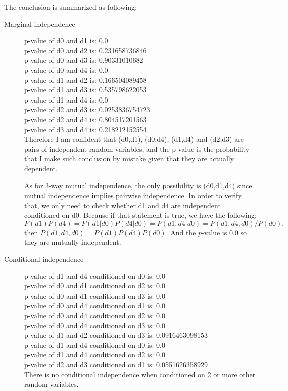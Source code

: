 \documentclass[11pt]{article}
\begin{document}
The conclusion is summarized as following:
\begin{description}
\item[Marginal independence]
p-value of d0 and d1 is: 0.0\\
p-value of d0 and d2 is: 0.231658736846\\
p-value of d0 and d3 is: 0.90331010682\\
p-value of d0 and d4 is: 0.0\\
p-value of d1 and d2 is: 0.166504089458\\
p-value of d1 and d3 is: 0.535798622053\\
p-value of d1 and d4 is: 0.0\\
p-value of d2 and d3 is: 0.0253836754723\\
p-value of d2 and d4 is: 0.804517201563\\
p-value of d3 and d4 is: 0.218212152554\\

Therefore I am confident that (d0,d1), (d0,d4), (d1,d4) and (d2,d3) are pairs of independent random variables, and the p-value is the probability that I make such conclusion by mistake given that they are actually dependent.

As for 3-way mutual independence, the only possibility is (d0,d1,d4) since mutual independence implies pairwise independence. In order to verify that, we only need to check whether d1 and d4 are independent conditioned on d0. Because if that statement is true, we have the following:
$$
P(d1)P(d4) = P(d1|d0)P(d4|d0) = P(d1,d4|d0) = P(d1,d4,d0)/P(d0), 
$$
then $P(d1,d4,d0) = P(d1)P(d4)P(d0)$. And the $p$-value is 0.0 so they are mutually independent.

\item[Conditional independence]
p-value of d1 and d4 conditioned on d0 is: 0.0\\
p-value of d0 and d1 conditioned on d2 is: 0.0\\
p-value of d0 and d1 conditioned on d3 is: 0.0\\
p-value of d0 and d4 conditioned on d1 is: 0.0\\
p-value of d0 and d4 conditioned on d2 is: 0.0\\
p-value of d0 and d4 conditioned on d3 is: 0.0\\
p-value of d1 and d2 conditioned on d3 is: 0.0916463098153\\
p-value of d1 and d4 conditioned on d0 is: 0.0\\
p-value of d1 and d4 conditioned on d2 is: 0.0\\
p-value of d2 and d3 conditioned on d1 is: 0.0551626358929\\

There is no conditional independence when conditioned on 2 or more other random variables.
\end{description}
\end{document}
